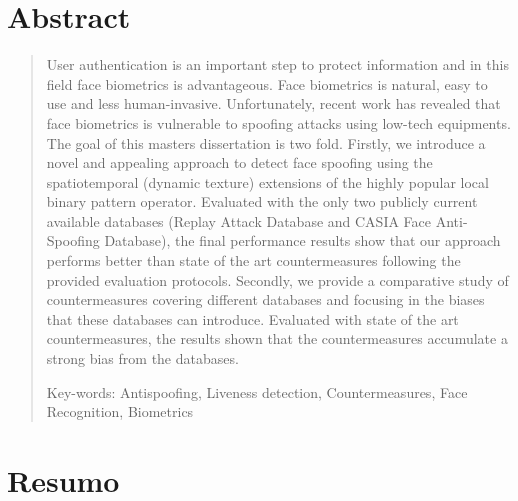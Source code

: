 \chapter*{Abstract}

\begin{quotation}

\noindent 

User authentication is an important step to protect information and in this field face biometrics is advantageous. Face biometrics is natural, easy to use and less human-invasive. Unfortunately, recent work has revealed that face biometrics is vulnerable to spoofing attacks using low-tech equipments. The goal of this masters dissertation is two fold. Firstly, we introduce a novel and appealing approach to detect face spoofing using the spatiotemporal (dynamic texture) extensions of the highly popular local binary pattern operator. Evaluated with the only two publicly current available databases (Replay Attack Database and CASIA Face Anti-Spoofing Database), the final performance results show that our approach performs better than state of the art countermeasures following the provided evaluation protocols. Secondly, we provide a comparative study of countermeasures covering different databases and focusing in the biases that these databases can introduce. Evaluated with state of the art countermeasures, the results shown that the countermeasures accumulate a strong bias from the databases. 

\vspace*{0.5cm}

\noindent Key-words:  Antispoofing, Liveness detection, Countermeasures, Face Recognition, Biometrics
\newpage%
\end{quotation}

\newpage
\null



\chapter*{Resumo}

